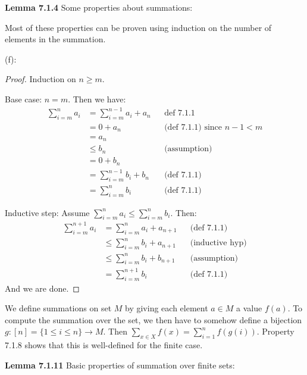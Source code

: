 \documentclass[answers,12pt]{exam}
\begin{document}
\textbf{Lemma 7.1.4} 
Some properties about summations:

\begin{solution}
    Most of these properties can be proven using induction on the number of elements in the summation.

    (f):
\begin{proof}
    Induction on $n \geq m$.

    Base case: $n=m$. Then we have:
    \[
        \begin{aligned}
            \sum_{i=m}^{n} a_i &= \sum_{i=m}^{n-1}a_i + a_n && \text{def 7.1.1} \\
            &= 0 + a_n && \text{(def 7.1.1) since } n-1 < m \\
            &= a_n \\
            &\leq b_n && \text{(assumption)} \\
            &= 0 + b_n \\
            &= \sum_{i=m}^{n-1}b_i + b_n && \text{(def 7.1.1)} \\
            &= \sum_{i=m}^{n} b_i && \text{(def 7.1.1)}
        \end{aligned}
    \]

    Inductive step:
    Assume $\sum_{i=m}^{n} a_i \leq \sum_{i=m}^{n} b_i$.
    Then:
    \[
        \begin{aligned}
            \sum_{i=m}^{n+1} a_i &= \sum_{i=m}^{n} a_i + a_{n+1} && \text{(def 7.1.1)} \\
            &\leq \sum_{i=m}^n b_i + a_{n+1} && \text{(inductive hyp)} \\
            &\leq \sum_{i=m}^n b_i + b_{n+1} && \text{(assumption)} \\
            &= \sum_{i=m}^{n+1} b_i && \text{(def 7.1.1)}
        \end{aligned}
    \]
    And we are done.
\end{proof}
\end{solution}

We define summations on set $M$ by giving each element $a \in M$ a value $f(a)$.
To compute the summation over the set, we then have to somehow define a bijection $g: [n] = \{1 \leq i \leq n\} \to M$.
Then $\sum_{x \in X}f(x) = \sum_{i=1}^{n} f(g(i))$.
Property 7.1.8 shows that this is well-defined for the finite case.


\textbf{Lemma 7.1.11} Basic properties of summation over finite sets:
\end{document}
